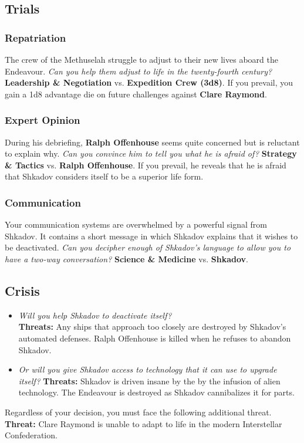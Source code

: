 \documentclass[11pt, a5paper, parskip=half-, DIV=12]{scrartcl}
\begin{document}
\subsection*{Trials}
\subsubsection*{Repatriation}
The crew of the Methuselah struggle to adjust to their new lives aboard the Endeavour. \textit{Can you help them adjust to life in the twenty-fourth century?} \textbf{Leadership \& Negotiation} vs. \textbf{Expedition Crew (3d8)}. If you prevail, you gain a 1d8 advantage die on future challenges against \textbf{Clare Raymond}.

\subsubsection*{Expert Opinion}
During his debriefing, \textbf{Ralph Offenhouse} seems quite concerned but is reluctant to explain why. \textit{Can you convince him to tell you what he is afraid of?} \textbf{Strategy \& Tactics} vs. \textbf{Ralph Offenhouse}. If you prevail, he reveals that he is afraid that Shkadov considers itself to be a superior life form.

\subsubsection*{Communication}
Your communication systems are overwhelmed by a powerful signal from Shkadov. It contains a short message in which Shkadov explains that it wishes to be deactivated. \textit{Can you decipher enough of Shkadov's language to allow you to have a two-way conversation?} \textbf{Science \& Medicine} vs. \textbf{Shkadov}.

\subsection*{Crisis}

\begin{itemize}
	\item \textit{Will you help Shkadov to deactivate itself?} \\ \textbf{Threats:}  Any ships that approach too closely are destroyed by Shkadov's automated defenses. Ralph Offenhouse is killed when he refuses to abandon Shkadov.
	\item \textit{Or will you give Shkadov access to technology that it can use to upgrade itself?} \textbf{Threats:} Shkadov is driven insane by the by the infusion of alien technology. The Endeavour is destroyed as Shkadov cannibalizes it for parts.
\end{itemize}
Regardless of your decision, you must face the following additional threat. \textbf{Threat:} Clare Raymond is unable to adapt to life in the modern Interstellar Confederation.
\end{document}
